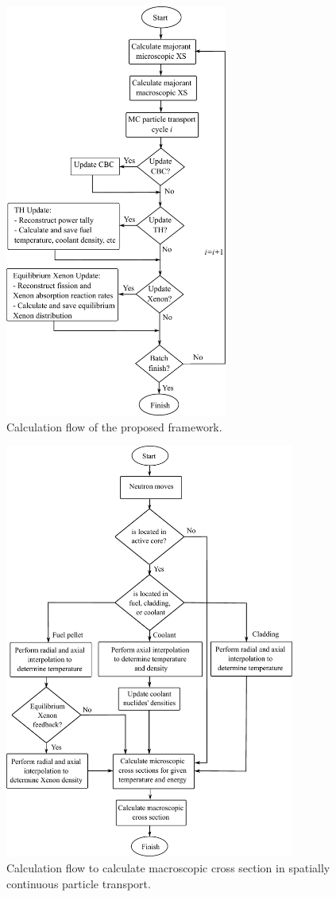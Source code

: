 \begin{figure}
    \centering
    \includegraphics[width=0.65\textwidth]{figs/calc_flow_1.pdf}
    \caption{Calculation flow of the proposed framework.}
       \label{fig_4}
\end{figure}
\begin{figure}
    \centering
    \includegraphics[width=0.85\textwidth]{figs/calc_flow_2.pdf}
    \caption[Calculation flow to calculate macroscopic cross section]{Calculation flow to calculate macroscopic cross section in spatially continuous particle transport.}
       \label{fig_5}
\end{figure}